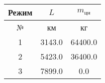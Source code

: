 \begin{tabular}{|c|c|c|}
\hline
Режим & $L$ & $m_{цн}$ \\ 
\hline
№ & км & кг \\ 
\hline
1 & 3143.0 & 64400.0 \\ 
\hline
2 & 5423.0 & 36400.0 \\ 
\hline
3 & 7899.0 & 0.0 \\ 
\hline
\end{tabular}